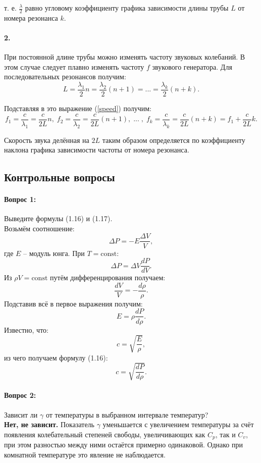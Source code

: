 \documentclass[a4paper,12pt]{article} %
\begin{document}
\noindent т. е. $\frac{\lambda}{2}$ равно угловому коэффициенту графика зависимости длины трубы $L$ от номера резонанса $k$. 

\paragraph{2.} При постоянной длине трубы можно изменять частоту звуковых колебаний. В этом случае следует плавно изменять частоту $f$ звукового генератора. Для последовательных резонансов получим:
\[
L = \frac{\lambda_1}{2}n = \frac{\lambda_2}{2} (n + 1) = ... = \frac{\lambda_k}{2} (n + k).
\]

Подставляя в это выражение (\ref{speed}) получим:
\[
f_1 = \frac{c}{\lambda_1} = \frac{c}{2L}n, \;
f_2 = \frac{c}{\lambda_2} = \frac{c}{2L} (n + 1), \; ... \;, \;
f_k = \frac{c}{\lambda_k} = \frac{c}{2L} (n + k) = f_1 + \frac{c}{2L} k.
\]

Скорость звука делённая на $2L$ таким образом определяется по коэффициенту наклона графика зависимости частоты от номера резонанса.


\subsection{Контрольные вопросы}

\paragraph{Вопрос 1:}
Выведите формулы (1.16) и (1.17).\\

Возьмём соотношение:
\[
\Delta P = - E\frac{\Delta V}{V},
\]
где $E$ -- модуль юнга. При $T = \text{const}$:
\[
\Delta P = \Delta V\frac{dP}{dV}.
\]
Из $\rho V = \text{const}$ путём дифференцирования получаем:
\[
\frac{dV}{V} = - \frac{d\rho}{\rho}.
\]
Подставив всё в первое выражения получим:
\[
E = \rho \frac{dP}{d\rho}.
\]
Известно, что:
\[
c = \sqrt{\frac{E}{\rho}},
\]
из чего получаем формулу (1.16):
\[
c = \sqrt{\frac{dP}{d\rho}}.
\]

	

\paragraph{Вопрос 2:}
Зависит ли $\gamma$ от температуры в выбранном интервале температур?\\

\textbf{Нет, не зависит.} Показатель $\gamma$ уменьшается с увеличением температуры за счёт появления колебательный степеней свободы, увеличивающих как $C_p$, так и $C_v$, при этом разностью между ними остаётся примерно одинаковой. Однако при комнатной температуре это явление не наблюдается.
\end{document}
